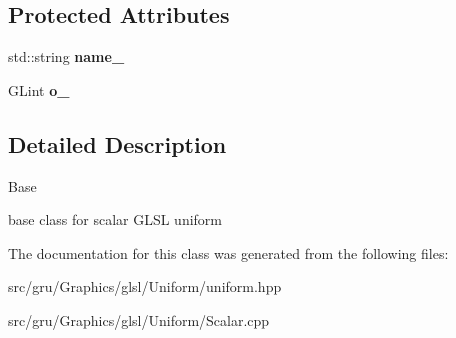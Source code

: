 \subsection*{\-Protected \-Attributes}
\begin{DoxyCompactItemize}
\item 
\hypertarget{classglutpp_1_1glsl_1_1Uniform_1_1Scalar_1_1Base_a0466080b02ec5a25e584fd1ff60d18d1}{std\-::string {\bfseries name\-\_\-}}\label{classglutpp_1_1glsl_1_1Uniform_1_1Scalar_1_1Base_a0466080b02ec5a25e584fd1ff60d18d1}

\item 
\hypertarget{classglutpp_1_1glsl_1_1Uniform_1_1Scalar_1_1Base_aa18f03236d61dcd13ca0577e1c1afb86}{\-G\-Lint {\bfseries o\-\_\-}}\label{classglutpp_1_1glsl_1_1Uniform_1_1Scalar_1_1Base_aa18f03236d61dcd13ca0577e1c1afb86}

\end{DoxyCompactItemize}


\subsection{\-Detailed \-Description}
\-Base 

base class for scalar \-G\-L\-S\-L uniform 

\-The documentation for this class was generated from the following files\-:\begin{DoxyCompactItemize}
\item 
src/gru/\-Graphics/glsl/\-Uniform/uniform.\-hpp\item 
src/gru/\-Graphics/glsl/\-Uniform/\-Scalar.\-cpp\end{DoxyCompactItemize}
